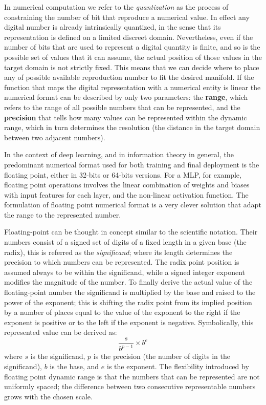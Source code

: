 In numerical computation we refer to the \textit{quantization} as the process of constraining the number of bit that reproduce a numerical value. In effect any digital number is already intrinsically quantized, in the sense that its representation is defined on a limited discreet domain. Nevertheless, even if the number of bits that are used to represent a digital quantity is finite, and so is the possible set of values that it can assume, the actual position of those values in the target domain is not strictly fixed. This means that we can decide where to place any of possible available reproduction number to fit the desired manifold.
If the function that maps the digital representation with a numerical entity is linear the numerical format can be described by only two parameters: the \textbf{range}, which refers to the range of all possible numbers that can be represented, and the \textbf{precision} that tells how many values can be represented within the dynamic range, which in turn determines the resolution (the distance in the target domain between two adjacent numbers).

In the context of deep learning, and in information theory in general, the predominant numerical format used for both training and final deployment is the floating point, either in 32-bits or 64-bits versions. For a \acs{MLP}, for example, floating point operations involves the linear combination of weights and biases with input features for each layer, and the non-linear activation function. The formulation of floating point numerical format is a very clever solution that adapt the range to the represented number.

Floating-point can be thought in concept similar to the scientific notation. Their numbers consist of a signed set of digits of a fixed length in a given base (the radix), this is referred as the \textit{significand}; where its length determines the precision to which numbers can be represented. The radix point position is assumed always to be within the significand, while a signed integer exponent modifies the magnitude of the number.
To finally derive the actual value of the floating-point number the significand is multiplied by the base and raised to the power of the exponent; this is shifting the radix point from its implied position by a number of places equal to the value of the exponent to the right if the exponent is positive or to the left if the exponent is negative.
%
Symbolically, this represented value can be derived as:
\begin{equation*}
    \frac{s}{b^{p-1}} \times b^e
\end{equation*}
where $s$ is the significand, $p$ is the precision (the number of digits in the significand), $b$ is the base, and $e$ is the exponent.
The flexibility introduced by floating point dynamic range is that the numbers that can be represented are not uniformly spaced; the difference between two consecutive representable numbers grows with the chosen scale.

